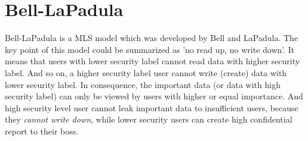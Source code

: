 \section{Bell-LaPadula}

Bell-LaPadula is a MLS model which was developed by Bell and LaPadula.
The key point of this model could be summarized as 'no read up, no write down'.
It means that users with lower security label cannot read data with higher security label.
And so on, a higher security label user cannot write (create) data with lower security label.
In consequence, the important data (or data with high security label) can only be viewed by users with higher or equal importance.
And high security level user cannot leak important data to insufficient users, because they \emph{cannot write down}, while lower security users can create high confidential report to their boss.



